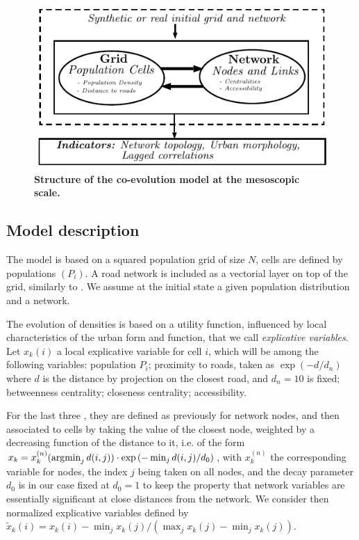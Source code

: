 \begin{figure}
	\includegraphics[width=\linewidth]{figures/mesocoevol.pdf}
	\caption{\textbf{Structure of the co-evolution model at the mesoscopic scale.}\label{fig:mesocoevolmodel:workflow}}
\end{figure}

\subsection{Model description}


The model is based on a squared population grid of size $N$,  cells are defined by populations $(P_i)$. A road network is included as a vectorial layer on top of the grid, similarly to \cite{raimbault2014hybrid}. We assume at the initial state a given population distribution and a network.

The evolution of densities is based on a utility function, influenced by local characteristics of the urban form and function, that we call \emph{explicative variables}. Let $x_k(i)$  a local explicative variable for cell $i$, which will be among the following variables: population $P_i$; proximity to roads, taken as $\exp (-d / d_n)$ where $d$ is the distance by projection on the closest road, and $d_n=10$ is fixed; betweenness centrality; closeness centrality; accessibility.

For the last three , they are defined as previously for network nodes, and then associated to cells by taking the value of the closest node, weighted by a decreasing function of the distance to it, i.e. of the form $x_k = x^{(n)}_k (\operatorname*{\arg\!\min}_j d(i,j)) \cdot \exp \left( -  \min_j d(i,j) / d_0 \right)$, with $x^{(n)}_k$ the corresponding variable for nodes, the index $j$ being taken on all nodes, and the decay parameter $d_0$ is in our case fixed at $d_0=1$ to keep the property that network variables are essentially significant at close distances from the network. We consider then normalized explicative variables defined by $\tilde{x}_k(i) = x_k(i) - \min_j x_k(j) / (\max_j x_k(j) - \min_j x_k(j))$.

